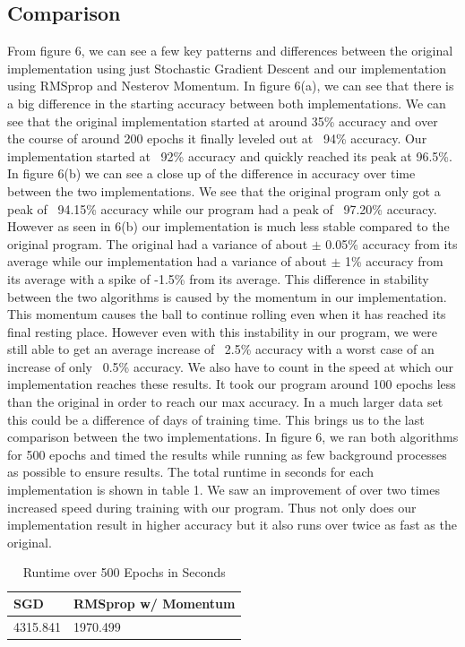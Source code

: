 \documentclass[12pt]{article}
\theoremstyle{definition}
\theoremstyle{plain}
\begin{document}
\subsection{Comparison}
From figure 6, we can see a few key patterns and differences between the original implementation using just Stochastic Gradient Descent\cite{nielsen_2017} and our implementation using RMSprop and Nesterov Momentum\cite{readthedocs,ruder_2016}. In figure 6(a), we can see that there is a big difference in the starting accuracy between both implementations. We can see that the original implementation started at around 35\% accuracy and over the course of around 200 epochs it finally leveled out at ~94\% accuracy. Our implementation started at ~92\% accuracy and quickly reached its peak at 96.5\%. In figure 6(b) we can see a close up of the difference in accuracy over time between the two implementations. We see that the original program only got a peak of ~94.15\% accuracy while our program had a peak of ~97.20\% accuracy. However as seen in 6(b) our implementation is much less stable compared to the original program. The original had a variance of about $\pm$ 0.05\% accuracy from its average while our implementation had a variance of about $\pm$ 1\% accuracy from its average with a spike of -1.5\% from its average. This difference in stability between the two algorithms is caused by the momentum in our implementation. This momentum causes the ball to continue rolling even when it has reached its final resting place. However even with this instability in our program, we were still able to get an average increase of ~2.5\% accuracy with a worst case of an increase of only ~0.5\% accuracy. We also have to count in the speed at which our implementation reaches these results. It took our program around 100 epochs less than the original in order to reach our max accuracy. In a much larger data set this could be a difference of days of training time. This brings us to the last comparison between the two implementations. In figure 6, we ran both algorithms for 500 epochs and timed the results while running as few background processes as possible to ensure results. The total runtime in seconds for each implementation is shown in table 1. We saw an improvement of over two times increased speed during training with our program. Thus not only does our implementation result in higher accuracy but it also runs over twice as fast as the original. 
\begin{table}
\caption{Runtime over 500 Epochs in Seconds}
\begin{center}
\begin{tabular}{p{}|p{}}
SGD & RMSprop w/ Momentum\\
\hline
4315.841 & 1970.499\\
\end{tabular}
\end{center}
\end{table}
\end{document}
